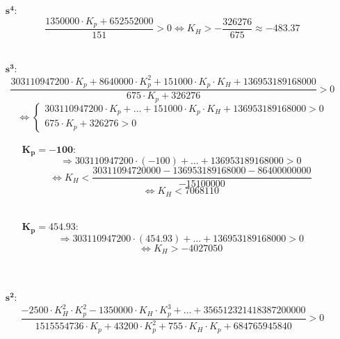 \documentclass[a4paper,12pt]{article}
\begin{document}
    \begin{itemize}
        \item[$\mathbf{s^4 :}$] \begin{equation}
                \frac{1350000 \cdot K_p + 652552000}{151} > 0
                \Leftrightarrow \boxed{
                    K_H > -\frac{326276}{675} \approx -483.37
                }
            \end{equation} \\
        \item[$\mathbf{s^3 :}$] \[
                \frac{303110947200 \cdot K_p + 8640000 \cdot K_p^2 + 151000 \cdot K_p \cdot K_H + 136953189168000}{675 \cdot K_p + 326276} > 0
            \]\[
                \Leftrightarrow
                \begin{cases}
                    303110947200 \cdot K_p + \dots + 151000 \cdot K_p \cdot K_H + 136953189168000 > 0 \\
                    675 \cdot K_p + 326276 > 0
                \end{cases}
            \]\begin{itemize}
                \item[$\mathbf{K_p = -100 :}$] \[
                        \Rightarrow 303110947200 \cdot (-100) + \dots + 136953189168000 > 0
                    \]\[
                        \Leftrightarrow K_H < \frac{30311094720000 - 136953189168000 - 86400000000}{-15100000}
                    \] \begin{equation}
                        \Leftrightarrow \boxed{K_H < 7068110}
                    \end{equation} \\
                \item[$\mathbf{K_p = 454.93 :}$] \[
                        \Rightarrow 303110947200 \cdot (454.93) + \dots + 136953189168000 > 0
                    \] \begin{equation}
                        \Leftrightarrow \boxed{K_H > -4027050}
                    \end{equation} \\\\
            \end{itemize}
        \item[$\mathbf{s^2 :}$] \[
                \frac{-2500 \cdot K_H^2 \cdot K_p^2 - 1350000 \cdot K_H \cdot K_p^3 + \dots + 356512321418387200000}{1515554736 \cdot K_p + 43200 \cdot K_p^2 + 755 \cdot K_H \cdot K_p + 684765945840} > 0
            \]\begin{itemize}

\end{itemize}
\end{itemize}
\end{document}
